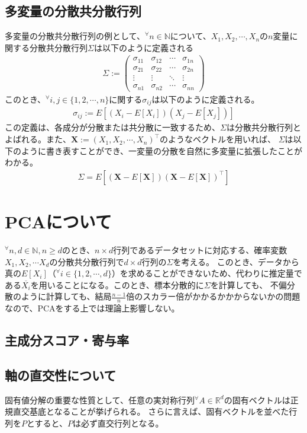 \documentclass[10pt]{ujarticle}
\begin{document}
\subsection{多変量の分散共分散行列}
多変量の分散共分散行列の例として、$^\forall n\in\mathbb{N}$について、$X_1,X_2,\cdots,X_n$の$n$変量に関する分散共分散行列$\Sigma$は以下のように定義される
$$
\begin{aligned}
  \Sigma:=\begin{pmatrix}\sigma_{11}&\sigma_{12}&\cdots&\sigma_{1n}\\\sigma_{21}&\sigma_{22}&\cdots&\sigma_{2n}\\\vdots&\vdots&\ddots&\vdots\\\sigma_{n1}&\sigma_{n2}&\cdots&\sigma_{nn}\end{pmatrix}
\end{aligned}
$$
このとき、$^\forall i,j\in\{1,2,\cdots,n\}$に関する$\sigma_{ij}$は以下のように定義される。
$$
\begin{aligned}
  \sigma_{ij}:=E[(X_i-E[X_i])(X_j-E[X_j])]
\end{aligned}
$$
この定義は、各成分が分散または共分散に一致するため、$\Sigma$は分散共分散行列とよばれる。また、$\mathbf{X}:=(X_1,X_2,\cdots,X_n)^\top$のようなベクトルを用いれば、
$\Sigma$は以下のように書き表すことができ、一変量の分散を自然に多変量に拡張したことがわかる。
$$
\begin{aligned}
  \Sigma=E[(\mathbf{X}-E[\mathbf{X}])(\mathbf{X}-E[\mathbf{X}])^\top]
\end{aligned}
$$

\section{PCAについて}
$^\forall n,d\in\mathbb{N},n\geq d$のとき、$n\times d$行列であるデータセットに対応する、確率変数$X_1,X_2,\cdots X_d$の分散共分散行列で$d\times d$行列の$\Sigma$を考える。
このとき、データから真の$E[X_i]$（$^\forall i\in\{1,2,\cdots, d\}$）を求めることができないため、代わりに推定量である$\overline{X_i}$を用いることになる。このとき、標本分散的に$\Sigma$を計算しても、
不偏分散のように計算しても、結局$\frac{n-1}{n}$倍のスカラー倍がかかるかかからないかの問題なので、PCAをする上では理論上影響しない。
\subsection{主成分スコア・寄与率}
\subsection{軸の直交性について}
固有値分解の重要な性質として、任意の実対称行列$^\forall A\in\mathbb{R}^d$の固有ベクトルは正規直交基底となることが挙げられる。
さらに言えば、固有ベクトルを並べた行列を$P$とすると、$P$は必ず直交行列となる。
\end{document}
